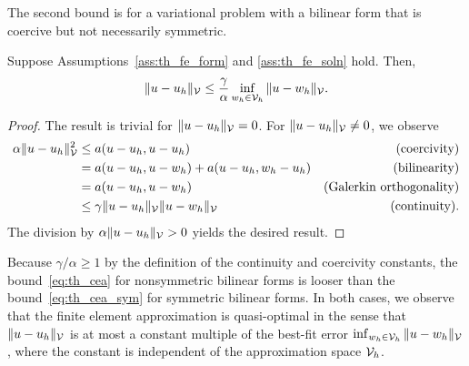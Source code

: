 The second bound is for a variational problem with a bilinear form that is coercive but not necessarily symmetric.
\begin{lemma}
  \label{lemma:th_cea_nonsym}
   Suppose Assumptions~\ref{ass:th_fe_form} and \ref{ass:th_fe_soln} hold. Then, 
  \begin{equation}
    \| u - u_h \|_{\mathcal{V}} \leq \frac{\gamma}{\alpha} \inf_{w_h \in \mathcal{V}_h} \| u - w_h \|_{\mathcal{V}}.
    \label{eq:th_cea}
  \end{equation}
  \begin{proof}
    The result is trivial for $\| u - u_h \|_{\mathcal{V}} = 0$.  For $\| u - u_h \|_{\mathcal{V}} \neq 0$, we observe
    \begin{align*}
      \alpha \| u - u_h \|^2_{\mathcal{V}}
      &\leq a(u - u_h, u - u_h) & \text{(coercivity)} \\
      &= a(u - u_h, u - w_h) + a(u - u_h, w_h - u_h) &\text{(bilinearity)} \\
      &= a(u - u_h, u - w_h) &\text{(Galerkin orthogonality)} \\
      &\leq \gamma \| u - u_h \|_{\mathcal{V}} \| u - w_h \|_{\mathcal{V}} &\text{(continuity)}.
    \end{align*}
    The division by $\alpha \| u - u_h \|_{\mathcal{V}} > 0$ yields the desired result.
  \end{proof}
\end{lemma}
Because $\gamma/\alpha \geq 1$ by the definition of the continuity and coercivity constants, the bound~\eqref{eq:th_cea} for nonsymmetric bilinear forms is looser than the bound~\eqref{eq:th_cea_sym} for symmetric bilinear forms.  In both cases, we observe that the finite element approximation is quasi-optimal in the sense that $\| u - u_h \|_{\mathcal{V}}$ is at most a constant multiple of the best-fit error $\inf_{w_h \in \mathcal{V}_h} \| u - w_h \|_{\mathcal{V}}$, where the constant is independent of the approximation space $\mathcal{V}_h$.

